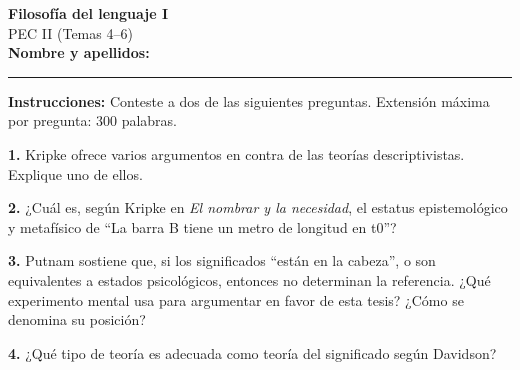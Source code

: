\documentclass[12pt,a4paper]{article}
\begin{document}
\begin{center}
    \Large \textbf{Filosofía del lenguaje I}\\[0.3cm]
    \large PEC II (Temas 4--6)\\[0.5cm]
    \normalsize \textbf{Nombre y apellidos:} \rule{10cm}{0.4pt}
\end{center}

\vspace{1cm}

\noindent
\textbf{Instrucciones:} Conteste a dos de las siguientes preguntas. Extensión máxima por pregunta: 300 palabras.

\vspace{1cm}

\noindent\textbf{1.} Kripke ofrece varios argumentos en contra de las teorías descriptivistas. Explique uno de ellos.

\vspace{2cm}

\noindent\textbf{2.} ¿Cuál es, según Kripke en \textit{El nombrar y la necesidad}, el estatus epistemológico y metafísico de ``La barra B tiene un metro de longitud en t0''?

\vspace{2cm}

\noindent\textbf{3.} Putnam sostiene que, si los significados ``están en la cabeza'', o son equivalentes a estados psicológicos, entonces no determinan la referencia. ¿Qué experimento mental usa para argumentar en favor de esta tesis? ¿Cómo se denomina su posición?

\vspace{2cm}

\noindent\textbf{4.} ¿Qué tipo de teoría es adecuada como teoría del significado según Davidson?

\vspace{2cm}
\end{document}

